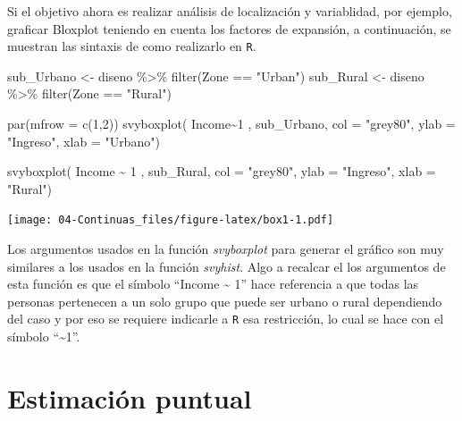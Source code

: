 \documentclass[
  12pt,
]{book}
\newenvironment{Shaded}{\begin{snugshade}}{\end{snugshade}}
\newcommand{\AttributeTok}[1]{\textcolor[rgb]{0.77,0.63,0.00}{#1}}
\newcommand{\DecValTok}[1]{\textcolor[rgb]{0.00,0.00,0.81}{#1}}
\newcommand{\FunctionTok}[1]{\textcolor[rgb]{0.00,0.00,0.00}{#1}}
\newcommand{\NormalTok}[1]{#1}
\newcommand{\OtherTok}[1]{\textcolor[rgb]{0.56,0.35,0.01}{#1}}
\newcommand{\SpecialCharTok}[1]{\textcolor[rgb]{0.00,0.00,0.00}{#1}}
\newcommand{\StringTok}[1]{\textcolor[rgb]{0.31,0.60,0.02}{#1}}
\begin{document}
Si el objetivo ahora es realizar análisis de localización y variablidad, por ejemplo, graficar Bloxplot teniendo en cuenta los factores de expansión, a continuación, se muestran las sintaxis de como realizarlo en \texttt{R}.

\begin{Shaded}
\begin{Highlighting}[]
\NormalTok{sub\_Urbano }\OtherTok{\textless{}{-}}\NormalTok{ diseno }\SpecialCharTok{\%\textgreater{}\%}  \FunctionTok{filter}\NormalTok{(Zone }\SpecialCharTok{==} \StringTok{"Urban"}\NormalTok{)}
\NormalTok{sub\_Rural  }\OtherTok{\textless{}{-}}\NormalTok{ diseno }\SpecialCharTok{\%\textgreater{}\%}  \FunctionTok{filter}\NormalTok{(Zone }\SpecialCharTok{==} \StringTok{"Rural"}\NormalTok{)}

\FunctionTok{par}\NormalTok{(}\AttributeTok{mfrow =} \FunctionTok{c}\NormalTok{(}\DecValTok{1}\NormalTok{,}\DecValTok{2}\NormalTok{))}
\FunctionTok{svyboxplot}\NormalTok{(}
\NormalTok{  Income}\SpecialCharTok{\textasciitilde{}}\DecValTok{1}\NormalTok{ ,}
\NormalTok{  sub\_Urbano,}
  \AttributeTok{col =} \StringTok{"grey80"}\NormalTok{,}
  \AttributeTok{ylab =} \StringTok{"Ingreso"}\NormalTok{,}
  \AttributeTok{xlab =} \StringTok{"Urbano"}\NormalTok{)}

\FunctionTok{svyboxplot}\NormalTok{(}
\NormalTok{  Income }\SpecialCharTok{\textasciitilde{}} \DecValTok{1}\NormalTok{ ,}
\NormalTok{  sub\_Rural,}
  \AttributeTok{col =} \StringTok{"grey80"}\NormalTok{,}
  \AttributeTok{ylab =} \StringTok{"Ingreso"}\NormalTok{,}
  \AttributeTok{xlab =} \StringTok{"Rural"}\NormalTok{)}
\end{Highlighting}
\end{Shaded}

\texttt{[image: 04-Continuas\_files/figure-latex/box1-1.pdf]}

Los argumentos usados en la función \emph{svyboxplot} para generar el gráfico son muy similares a los usados en la función \emph{svyhist}. Algo a recalcar el los argumentos de esta función es que el símbolo ``Income \textasciitilde{} 1'' hace referencia a que todas las personas pertenecen a un solo grupo que puede ser urbano o rural dependiendo del caso y por eso se requiere indicarle a \texttt{R} esa restricción, lo cual se hace con el símbolo ``\textasciitilde1''.

\hypertarget{estimaciuxf3n-puntual}{%
\section{Estimación puntual}\label{estimaciuxf3n-puntual}}
\end{document}
